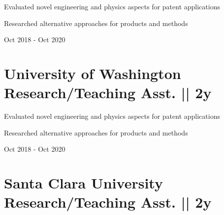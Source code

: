 \begin{detail}
\vspace{-2.5ex}
\BulletItem
Evaluated novel engineering and physics aspects for patent applications

\BulletItem
Researched alternative approaches for products and methods
\end{detail}

\begin{subtitle}
\vspace{-7.8ex}
{{Oct 2018 - Oct 2020}} 
\end{subtitle}

\begin{subtitle}
\vspace{-2.0ex}
\end{subtitle}


\section
{\textbf{University of Washington} \newline
Research/Teaching Asst. || 2y}{}


\begin{detail}
\vspace{-2.5ex}
\BulletItem
Evaluated novel engineering and physics aspects for patent applications

\BulletItem
Researched alternative approaches for products and methods
\end{detail}

\begin{subtitle}
\vspace{-7.8ex}
{{Oct 2018 - Oct 2020}} 
\end{subtitle}

\begin{subtitle}
\vspace{-2.0ex}
\end{subtitle}


\section
{\textbf{Santa Clara University} \newline
Research/Teaching Asst. || 2y}{}


